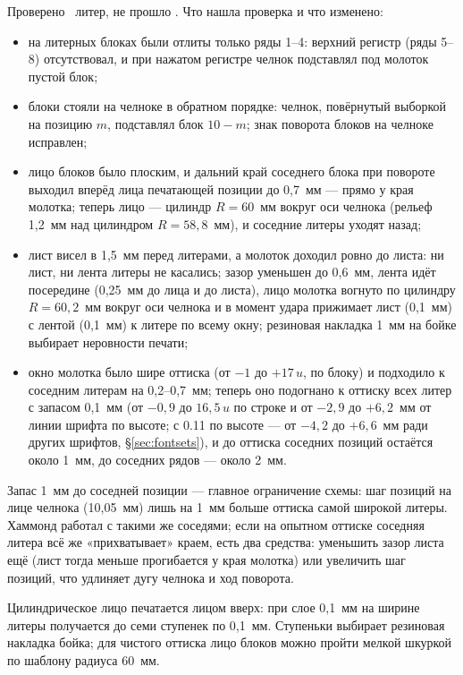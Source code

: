 Проверено \mnstrike\ литер, не прошло \mnstrikebad. Что нашла проверка и что изменено:
\begin{itemize}
  \item на литерных блоках были отлиты только ряды 1--4: верхний регистр (ряды 5--8) отсутствовал, и при нажатом регистре челнок подставлял под молоток пустой блок;
  \item блоки стояли на челноке в обратном порядке: челнок, повёрнутый выборкой на позицию $m$, подставлял блок $10 - m$; знак поворота блоков на челноке исправлен;
  \item лицо блоков было плоским, и дальний край соседнего блока при повороте выходил вперёд лица печатающей позиции до 0,7~мм — прямо у края молотка; теперь лицо — цилиндр $R = 60$~мм вокруг оси челнока (рельеф 1,2~мм над цилиндром $R = 58{,}8$~мм), и соседние литеры уходят назад;
  \item лист висел в 1,5~мм перед литерами, а молоток доходил ровно до листа: ни лист, ни лента литеры не касались; зазор уменьшен до 0,6~мм, лента идёт посередине (0,25~мм до лица и до листа), лицо молотка вогнуто по цилиндру $R = 60{,}2$~мм вокруг оси челнока и в момент удара прижимает лист (0,1~мм) с лентой (0,1~мм) к литере по всему окну; резиновая накладка 1~мм на бойке выбирает неровности печати;
  \item окно молотка было шире оттиска (от $-1$ до $+17\,u$, по блоку) и подходило к соседним литерам на 0,2--0,7~мм; теперь оно подогнано к оттиску всех литер с запасом 0,1~мм (от $-0{,}9$ до $16{,}5\,u$ по строке и от $-2{,}9$ до $+6{,}2$~мм от линии шрифта по высоте; с 0.11 по высоте — от $-4{,}2$ до $+6{,}6$~мм ради других шрифтов, \S\ref{sec:fontsets}), и до оттиска соседних позиций остаётся около 1~мм, до соседних рядов — около 2~мм.
\end{itemize}
Запас 1~мм до соседней позиции — главное ограничение схемы: шаг позиций на лице челнока (10,05~мм) лишь на 1~мм больше оттиска самой широкой литеры. Хаммонд работал с такими же соседями; если на опытном оттиске соседняя литера всё же «прихватывает» краем, есть два средства: уменьшить зазор листа ещё (лист тогда меньше прогибается у края молотка) или увеличить шаг позиций, что удлиняет дугу челнока и ход поворота.

Цилиндрическое лицо печатается лицом вверх: при слое 0,1~мм на ширине литеры получается до семи ступенек по 0,1~мм. Ступеньки выбирает резиновая накладка бойка; для чистого оттиска лицо блоков можно пройти мелкой шкуркой по шаблону радиуса 60~мм.

